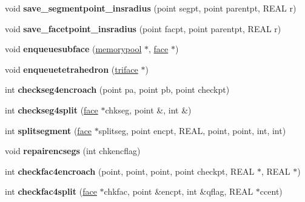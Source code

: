 \begin{DoxyCompactItemize}
void {\bfseries save\+\_\+segmentpoint\+\_\+insradius} (point segpt, point parentpt, R\+E\+AL r)
\item 
\mbox{\label{classtetgenmesh_a08abd95798207d0d32e9086dd8070e58}} 
void {\bfseries save\+\_\+facetpoint\+\_\+insradius} (point facpt, point parentpt, R\+E\+AL r)
\item 
\mbox{\label{classtetgenmesh_aa6b6a173116973ca6ecb08f538321ebd}} 
void {\bfseries enqueuesubface} (\hyperlink{classtetgenmesh_1_1memorypool}{memorypool} $\ast$, \hyperlink{classtetgenmesh_1_1face}{face} $\ast$)
\item 
\mbox{\label{classtetgenmesh_a86e87c56bd1717f1741adca87cb21acb}} 
void {\bfseries enqueuetetrahedron} (\hyperlink{classtetgenmesh_1_1triface}{triface} $\ast$)
\item 
\mbox{\label{classtetgenmesh_ab30dcd2e1231eed4ff1a40d8b178db95}} 
int {\bfseries checkseg4encroach} (point pa, point pb, point checkpt)
\item 
\mbox{\label{classtetgenmesh_a7f8037ef5cacc7b4b38c81553f2d8180}} 
int {\bfseries checkseg4split} (\hyperlink{classtetgenmesh_1_1face}{face} $\ast$chkseg, point \&, int \&)
\item 
\mbox{\label{classtetgenmesh_a6394d7b4d386e8d08077c39cd8983e0e}} 
int {\bfseries splitsegment} (\hyperlink{classtetgenmesh_1_1face}{face} $\ast$splitseg, point encpt, R\+E\+AL, point, point, int, int)
\item 
\mbox{\label{classtetgenmesh_a7af360f1ae413f9e0d7803ccae55b6d6}} 
void {\bfseries repairencsegs} (int chkencflag)
\item 
\mbox{\label{classtetgenmesh_a7e79473a5bfee155427a924bba678fbd}} 
int {\bfseries checkfac4encroach} (point, point, point, point checkpt, R\+E\+AL $\ast$, R\+E\+AL $\ast$)
\item 
\mbox{\label{classtetgenmesh_aa70e994f2091786686a9336461e5d94d}} 
int {\bfseries checkfac4split} (\hyperlink{classtetgenmesh_1_1face}{face} $\ast$chkfac, point \&encpt, int \&qflag, R\+E\+AL $\ast$ccent)

\end{DoxyCompactItemize}
